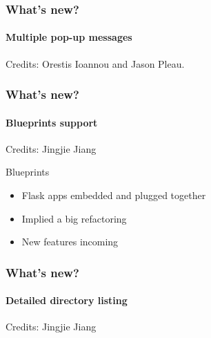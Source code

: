\documentclass{beamer}
\begin{document}
\begin{frame}
  \frametitle{What's new?}
  \framesubtitle{Multiple pop-up messages}
  Credits: Orestis Ioannou and Jason Pleau.
  \vspace{7mm}
  ~\\
\end{frame}

\begin{frame}
  \frametitle{What's new?}
  \framesubtitle{Blueprints support}
  Credits: Jingjie Jiang
  \vspace{7mm}
  ~\\  
  \begin{block}{Blueprints}
    \begin{itemize}
    \item Flask apps embedded and plugged together
    \item Implied a big refactoring
    \item New features incoming
    \end{itemize}
  \end{block}
\end{frame}

\begin{frame}
  \frametitle{What's new?}
  \framesubtitle{Detailed directory listing}
  Credits: Jingjie Jiang
  
  ~\\
\end{frame}
\end{document}
